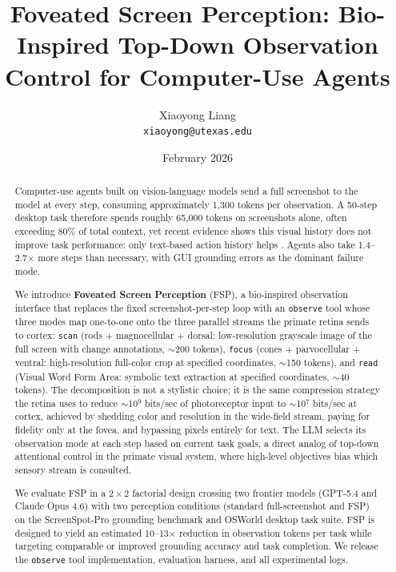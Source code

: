 \documentclass[11pt,a4paper]{article}
\title{Foveated Screen Perception: Bio-Inspired Top-Down Observation Control for Computer-Use Agents}
\author{
  Xiaoyong Liang \\
  \texttt{xiaoyong@utexas.edu}
}
\date{February 2026}
\begin{document}
\maketitle


\begin{abstract}
Computer-use agents built on vision-language models send a full screenshot to the model at every step, consuming approximately 1{,}300 tokens per observation.
A 50-step desktop task therefore spends roughly 65{,}000 tokens on screenshots alone, often exceeding 80\% of total context, yet recent evidence shows this visual history does not improve task performance: only text-based action history helps \cite{osworld-human}.
Agents also take 1.4--2.7$\times$ more steps than necessary, with GUI grounding errors as the dominant failure mode.

We introduce \textbf{Foveated Screen Perception} (FSP), a bio-inspired observation interface that replaces the fixed screenshot-per-step loop with an \texttt{observe} tool whose three modes map one-to-one onto the three parallel streams the primate retina sends to cortex: \texttt{scan} (rods + magnocellular + dorsal: low-resolution grayscale image of the full screen with change annotations, $\sim$200 tokens), \texttt{focus} (cones + parvocellular + ventral: high-resolution full-color crop at specified coordinates, $\sim$150 tokens), and \texttt{read} (Visual Word Form Area: symbolic text extraction at specified coordinates, $\sim$40 tokens).
The decomposition is not a stylistic choice; it is the same compression strategy the retina uses to reduce $\sim$10$^9$ bits/sec of photoreceptor input to $\sim$10$^7$ bits/sec at cortex, achieved by shedding color and resolution in the wide-field stream, paying for fidelity only at the fovea, and bypassing pixels entirely for text.
The LLM selects its observation mode at each step based on current task goals, a direct analog of top-down attentional control in the primate visual system, where high-level objectives bias which sensory stream is consulted.

We evaluate FSP in a $2 \times 2$ factorial design crossing two frontier models (GPT-5.4 and Claude Opus 4.6) with two perception conditions (standard full-screenshot and FSP) on the ScreenSpot-Pro grounding benchmark and OSWorld desktop task suite.
FSP is designed to yield an estimated 10--13$\times$ reduction in observation tokens per task while targeting comparable or improved grounding accuracy and task completion.
We release the \texttt{observe} tool implementation, evaluation harness, and all experimental logs.
\end{abstract}
\end{document}
